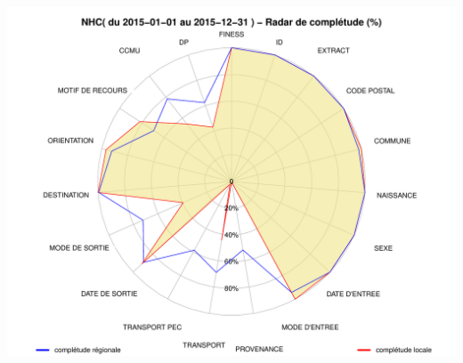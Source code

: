 \documentclass[]{article}
\begin{document}
\includegraphics{completude_files/figure-latex/finess-16.pdf}
\end{document}
